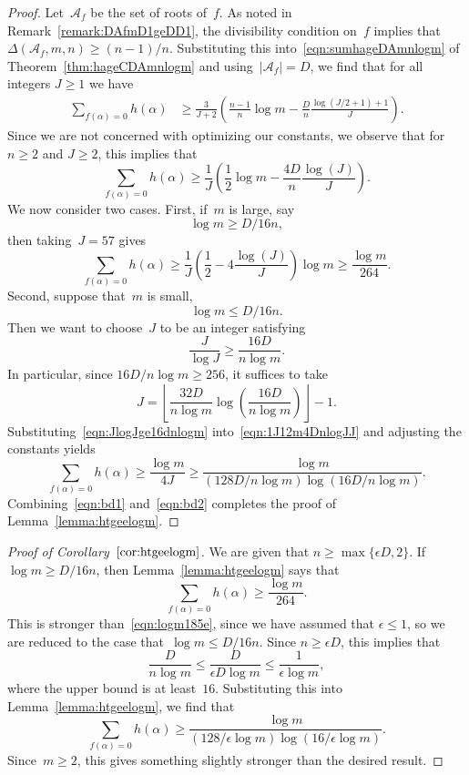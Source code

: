 \begin{proof}
Let~${{\mathcal A}}_f$ be the set of roots of~$f$.  As noted in
Remark~\ref{remark:DAfmD1geDD1}, the divisibility condition on~$f$
implies that ${\Delta}({{\mathcal A}}_f,m,n)\ge (n-1)/n$.  Substituting this
into~\eqref{eqn:sumhageDAmnlogm} of Theorem~\ref{thm:hageCDAmnlogm}
and using~$|{{\mathcal A}}_f|=D$, we find that for all integers $J\ge1$ we have
\begin{align*}
  \sum_{f({\alpha})=0}h({\alpha})
  &\ge \frac{3}{J+2}
      \left(\frac{n-1}{n}\log m - \frac{D}{n}\frac{\log(J/2+1)+1}{J}\right).
\end{align*}
Since we are not concerned with optimizing our constants, we observe
that for $n\ge2$ and $J\ge2$, this implies that
\begin{equation}
  \label{eqn:1J12m4DnlogJJ}
  \sum_{f({\alpha})=0}h({\alpha})
  \ge \frac{1}{J}
      \left(\frac{1}{2}\log m - \frac{4D}{n}\frac{\log(J)}{J}\right).
\end{equation}
We now consider two cases. First, if~$m$ is large, say
\[
  \log m \ge D/16n,
\]
then taking~$J=57$ gives
\begin{equation}
  \label{eqn:bd1}
  \sum_{f({\alpha})=0}h({\alpha}) 
     \ge \frac{1}{J}\left(\frac12-4\frac{\log(J)}{J}\right)\log m
     \ge \frac{\log m}{264}.
\end{equation}
Second, suppose that~$m$ is small,
\[
  \log m \le D/16n.
\]
Then we want to choose~$J$ to be an integer satisfying
\begin{equation}
  \label{eqn:JlogJge16dnlogm}
  \frac{J}{\log J} \ge \frac{16D}{n\log m}.
\end{equation}
In particular, since $16D/n\log m\ge256$, it suffices
to take
\[
  J = \left\lfloor \frac{32D}{n\log m}\log\left(\frac{16D}{n\log m}\right)
     \right\rfloor - 1.
\]
Substituting~\eqref{eqn:JlogJge16dnlogm}
into~\eqref{eqn:1J12m4DnlogJJ} and adjusting the constants yields
\begin{equation}
  \label{eqn:bd2}
  \sum_{f({\alpha})=0}h({\alpha}) \ge \frac{\log m}{4J} \ge
    \frac{\log m}{(128D/n\log m)\log(16D/n\log m)}.
\end{equation}
Combining~\eqref{eqn:bd1} and~\eqref{eqn:bd2} completes the proof of
Lemma~\ref{lemma:htgeelogm}.
\end{proof}

\begin{proof}[Proof of Corollary~$\ref{cor:htgeelogm}$]
We are given that $n\ge\max\{{\epsilon} D,2\}$. If $\log m\ge D/16n$,
then Lemma~\ref{lemma:htgeelogm} says that
\[
  \sum_{f({\alpha})=0}h({\alpha}) \ge \frac{\log m}{264}.
\]
This is stronger than~\eqref{eqn:logm185e}, since we have assumed that
${\epsilon}\le1$, so we are reduced to the case that~$\log m\le D/16n$.  Since
$n\ge{\epsilon} D$, this implies that
\[
  \frac{D}{n\log m}\le\frac{D}{{\epsilon} D\log m} \le \frac{1}{{\epsilon}\log m},
\]
where the upper bound is at least~$16$. Substituting this into
Lemma~\ref{lemma:htgeelogm}, we find that
\[
  \sum_{f({\alpha})=0}h({\alpha}) \ge
     \frac{\log m}{(128/{\epsilon}\log m)\log(16/{\epsilon}\log m)}.
\]
Since~$m\ge2$, this gives something slightly stronger than the desired
result.
\end{proof}

